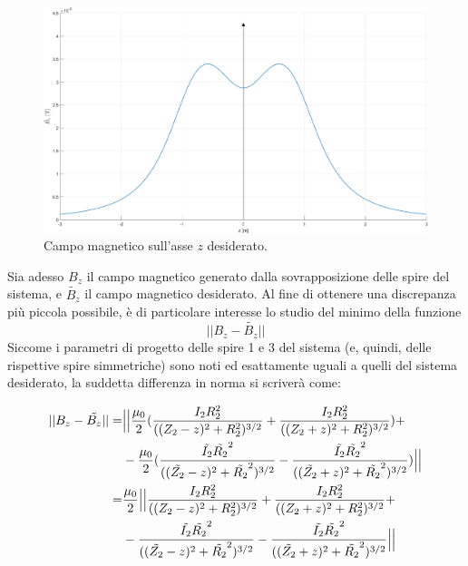 \documentclass[a4paper, 11pt]{article}
\begin{document}
\begin{figure}[H]
	\centering
	\includegraphics[width=16cm]{assets/figure2}
	\caption{Campo magnetico sull'asse $z$ desiderato.}
\end{figure}
\noindent
Sia adesso $B_{z}$ il campo magnetico generato dalla sovrapposizione delle spire
del sistema, e $\tilde{B_{z}}$ il campo magnetico desiderato. Al fine di
ottenere una discrepanza più piccola possibile, è di particolare interesse lo
studio del minimo della funzione
\[||B_{z}-\tilde{B_{z}}||\] Siccome i parametri di progetto delle spire 1 e 3
del sistema (e, quindi, delle rispettive spire simmetriche) sono noti ed
esattamente uguali a quelli del sistema desiderato, la suddetta differenza in
norma si scriverà come:

\begin{equation}
	\begin{split}
		||B_{z}-\tilde{B_{z}}||
		=& \Bigl|\Bigl|\frac{\mu_{0}}{2}(\frac{I_{2}R_{2}^{2}}{((Z_{2}-z)^{2}+R_{2}^{2})^{3/2}}+\frac{I_{2}R_{2}^{2}}{((Z_{2}+z)^{2}+R_{2}^{2})^{3/2}})+ \\
		 & -\frac{\mu_{0}}{2}(\frac{\tilde{I_{2}}\tilde{R_{2}}^{2}}{((\tilde{Z_{2}}-z)^{2}+\tilde{R_{2}}^{2})^{3/2}}-\frac{\tilde{I_{2}}\tilde{R_{2}}^{2}}{((\tilde{Z_{2}}+z)^{2}+\tilde{R_{2}}^{2})^{3/2}})\Bigr|\Bigr| \\
		=& \frac{\mu_{0}}{2}\Bigl|\Bigl|\frac{I_{2}R_{2}^{2}}{((Z_{2}-z)^{2}+R_{2}^{2})^{3/2}}+\frac{I_{2}R_{2}^{2}}{((Z_{2}+z)^{2}+R_{2}^{2})^{3/2}}+ \\
		 & -\frac{\tilde{I_{2}}\tilde{R_{2}}^{2}}{((\tilde{Z_{2}}-z)^{2}+\tilde{R_{2}}^{2})^{3/2}}-\frac{\tilde{I_{2}}\tilde{R_{2}}^{2}}{((\tilde{Z_{2}}+z)^{2}+\tilde{R_{2}}^{2})^{3/2}}\Bigr|\Bigr|
	\end{split} 
\end{equation}
\noindent
\end{document}
